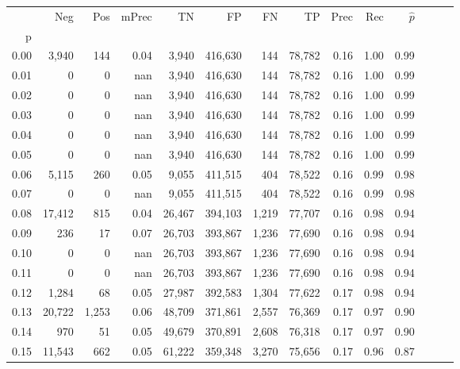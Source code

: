\begin{tabular}{rrrrrrrrrrrrrr}
\toprule
{} &     Neg &    Pos & mPrec &       TN &       FP &      FN &      TP &  Prec &   Rec & $\hat{p}$ \\
p    &         &        &       &          &          &         &         &       &       &           \\
\midrule
0.00 &   3,940 &    144 &  0.04 &    3,940 &  416,630 &     144 &  78,782 &  0.16 &  1.00 &      0.99 \\
0.01 &       0 &      0 &   nan &    3,940 &  416,630 &     144 &  78,782 &  0.16 &  1.00 &      0.99 \\
0.02 &       0 &      0 &   nan &    3,940 &  416,630 &     144 &  78,782 &  0.16 &  1.00 &      0.99 \\
0.03 &       0 &      0 &   nan &    3,940 &  416,630 &     144 &  78,782 &  0.16 &  1.00 &      0.99 \\
0.04 &       0 &      0 &   nan &    3,940 &  416,630 &     144 &  78,782 &  0.16 &  1.00 &      0.99 \\
0.05 &       0 &      0 &   nan &    3,940 &  416,630 &     144 &  78,782 &  0.16 &  1.00 &      0.99 \\
0.06 &   5,115 &    260 &  0.05 &    9,055 &  411,515 &     404 &  78,522 &  0.16 &  0.99 &      0.98 \\
0.07 &       0 &      0 &   nan &    9,055 &  411,515 &     404 &  78,522 &  0.16 &  0.99 &      0.98 \\
0.08 &  17,412 &    815 &  0.04 &   26,467 &  394,103 &   1,219 &  77,707 &  0.16 &  0.98 &      0.94 \\
0.09 &     236 &     17 &  0.07 &   26,703 &  393,867 &   1,236 &  77,690 &  0.16 &  0.98 &      0.94 \\
0.10 &       0 &      0 &   nan &   26,703 &  393,867 &   1,236 &  77,690 &  0.16 &  0.98 &      0.94 \\
0.11 &       0 &      0 &   nan &   26,703 &  393,867 &   1,236 &  77,690 &  0.16 &  0.98 &      0.94 \\
0.12 &   1,284 &     68 &  0.05 &   27,987 &  392,583 &   1,304 &  77,622 &  0.17 &  0.98 &      0.94 \\
0.13 &  20,722 &  1,253 &  0.06 &   48,709 &  371,861 &   2,557 &  76,369 &  0.17 &  0.97 &      0.90 \\
0.14 &     970 &     51 &  0.05 &   49,679 &  370,891 &   2,608 &  76,318 &  0.17 &  0.97 &      0.90 \\
0.15 &  11,543 &    662 &  0.05 &   61,222 &  359,348 &   3,270 &  75,656 &  0.17 &  0.96 &      0.87 \\

\end{tabular}
